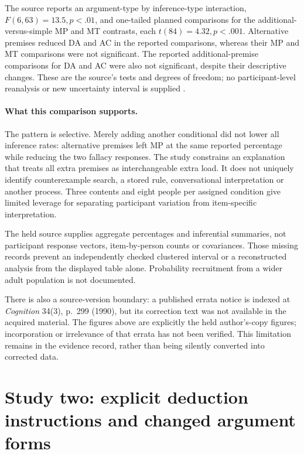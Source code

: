 The source reports an argument-type by inference-type interaction,
\(F(6,63)=13.5,p<.01\), and one-tailed planned comparisons for the
additional-versus-simple MP and MT contrasts, each
\(t(84)=4.32,p<.001\). Alternative premises reduced DA and AC in the
reported comparisons, whereas their MP and MT comparisons were not
significant. The reported additional-premise comparisons for DA and AC
were also not significant, despite their descriptive changes. These are
the source's tests and degrees of freedom; no participant-level reanalysis
or new uncertainty interval is supplied \cite[pp.~68--69]{Byrne1989Suppression}.

\paragraph{What this comparison supports.}
The pattern is selective. Merely adding another conditional did not lower
all inference rates: alternative premises left MP at the same reported
percentage while reducing the two fallacy responses. The study constrains
an explanation that treats all extra premises as interchangeable extra
load. It does not uniquely identify counterexample search, a stored rule,
conversational interpretation or another process. Three contents and eight
people per assigned condition give limited leverage for separating
participant variation from item-specific interpretation.

The held source supplies aggregate percentages and inferential summaries,
not participant response vectors, item-by-person counts or covariances.
Those missing records prevent an independently checked clustered interval
or a reconstructed analysis from the displayed table alone. Probability
recruitment from a wider adult population is not documented.

There is also a source-version boundary: a published errata notice is
indexed at \emph{Cognition} 34(3), p.~299 (1990), but its correction text
was not available in the acquired material. The figures above are explicitly
the held author's-copy figures; incorporation or irrelevance of that errata
has not been verified. This limitation remains in the evidence record,
rather than being silently converted into corrected data.

\section{Study two: explicit deduction instructions and changed argument forms}
\label{sec:p19-cariani-rips-suppression-study}

